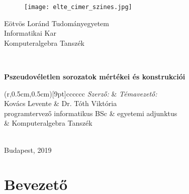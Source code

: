 \documentclass[hidelinks, 12pt]{article}
\begin{document}
	\makeatletter
	\renewcommand*{\thetable}{\arabic{table}}
	\renewcommand*{\thefigure}{\arabic{figure}}
	\let\c@table\c@figure
	\makeatother 
	\captionsetup[figure]{name=Ábra}
	\captionsetup[table]{name=Ábra}
	\sloppy
	\newcommand{\sectionbreak}{\clearpage}
	\begin{titlepage}
		\begin{minipage}{0.36\textwidth}
			\begin{figure}[H]
				\texttt{[image: elte\_cimer\_szines.jpg]}
			\end{figure}
		\end{minipage}
		\begin{minipage}{0.60\textwidth}
			\begin{center}
				{\Large Eötvös Loránd Tudományegyetem \\
					Informatikai Kar \\
					Komputeralgebra Tanszék \\}
			\end{center}
		\end{minipage}
		\\[0.3\baselineskip]
		\noindent\makebox[\linewidth]{\rule{\textwidth}{0.5pt}}
		\vspace*{\fill}
		\centering
		\vspace*{0.5cm}
		
		\huge\bfseries
		Pszeudovéletlen sorozatok mértékei és konstrukciói		
		\vspace*{0.5cm}
		
		\vspace*{\fill}
		\begin{TAB}(r,0.5cm,0.5cm)[9pt]{cc}{cccc}
			\normalfont \normalsize \textsl{ Szerző: } & \normalfont \normalsize \textsl{ Témavezető: } \\
			\normalsize Kovács Levente & \normalsize Dr. Tóth Viktória \\
			\normalfont \normalsize programtervező informatikus BSc & \normalfont \normalsize egyetemi adjunktus \\
			\normalsize & \normalfont \normalsize Komputeralgebra Tanszék
		\end{TAB}
		\\
		\large \normalfont Budapest, 2019
	\end{titlepage}
	\renewcommand*\contentsname{Tartalomjegyzék}
	\tableofcontents
	\newpage
	\section{Bevezető}
\end{document}
